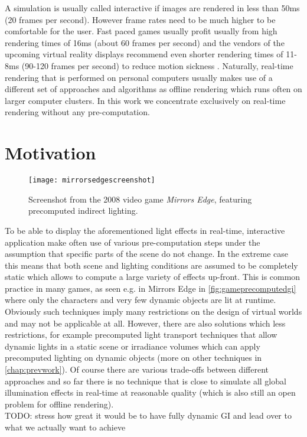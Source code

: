 \documentclass[thesis.tex]{subfiles}
\begin{document}
A simulation is usually called interactive if images are rendered in less than 50ms (20 frames per second).
However frame rates need to be much higher to be comfortable for the user.
Fast paced games usually profit usually from high rendering times of 16ms (about 60 frames per second) \cite{bib:shooterfps} and the vendors of the upcoming virtual reality displays recommend even shorter rendering times of 11-8ms (90-120 frames per second) to reduce motion sickness \cite{bib:oculushighfps} .
Naturally, real-time rendering that is performed on personal computers usually makes use of a different set of approaches and algorithms as offline rendering which runs often on larger computer clusters.
In this work we concentrate exclusively on real-time rendering without any pre-computation.

\section{Motivation}
\begin{figure}[h]
\centering
\texttt{[image: mirrorsedgescreenshot]}
\caption{Screenshot from the 2008 video game \emph{Mirrors Edge}, featuring precomputed indirect lighting.}
\label{fig:gameprecomputedgi}
\end{figure}
To be able to display the aforementioned light effects in real-time, interactive application make often use of various pre-computation steps under the assumption that specific parts of the scene do not change.
In the extreme case this means that both scene and lighting conditions are assumed to be completely static which allows to compute a large variety of effects up-front.
This is common practice in many games, as seen e.g. in Mirrors Edge in \autoref{fig:gameprecomputedgi} where only the characters and very few dynamic objects are lit at runtime.
\\
Obviously such techniques imply many restrictions on the design of virtual worlds and may not be applicable at all.
However, there are also solutions which less restrictions, for example precomputed light transport techniques that allow dynamic lights in a static scene or irradiance volumes which can apply precomputed lighting on dynamic objects (more on other techniques in \autoref{chap:prevwork}).
Of course there are various trade-offs between different approaches and so far there is no technique that is close to simulate all global illumination effects in real-time at reasonable quality (which is also still an open problem for offline rendering).
\\
TODO: stress how great it would be to have fully dynamic GI and lead over to what we actually want to achieve
\end{document}
